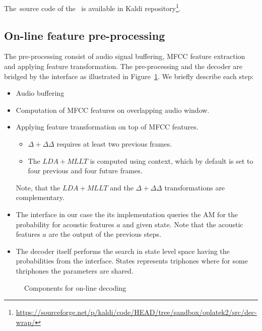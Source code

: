 The~source code of the~ is available in Kaldi repository\footnote{\url{https://sourceforge.net/p/kaldi/code/HEAD/tree/sandbox/oplatek2/src/dec-wrap/}}.

\subsection{On-line feature pre-processing} 
\label{sub:preprocess}
The pre-processing consist of audio signal buffering, \ac{MFCC} feature extraction and applying feature transformation. 
The pre-processing and the decoder are bridged by the  interface as illustrated in Figure~\ref{fig:online_pipeline}.
We briefly describe each step:
\begin{itemize}
    \item Audio buffering
    \item Computation of \ac{MFCC} features on overlapping audio window.
    \item Applying feature transformation on top of \ac{MFCC} features. 
        \begin{itemize}
            \item $\Delta + \Delta\Delta$ requires at least two previous frames. 
            \item The $LDA+MLLT$ is computed using context,
                which by default is set to four previous and four future frames.
        \end{itemize}
        Note, that the $LDA+MLLT$ and the $\Delta+\Delta\Delta$ transformations are complementary.
    \item The  interface in our case the its  implementation
        queries the \ac{AM} for the probability for acoustic features $a$ and given state.
        Note that the acoustic features $a$ are the output of the previous steps.
    \item The decoder itself performs the search in state level space 
        having the probabilities from the  interface. 
        States represents triphones where for some thriphones the parameters are shared.
\end{itemize}

\begin{figure}[!htp]
    \begin{center}
        
        \caption{Components for on-line decoding}
    \label{fig:online_pipeline} 
    \end{center}
\end{figure}

